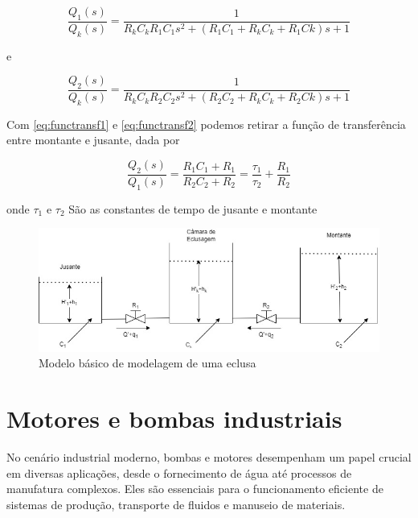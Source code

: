 \begin{equation} \label{eq:functransf1}
\frac{Q_1(s)}{Q_k(s)}=\frac{1}{R_kC_kR_1C_1s^2+(R_1C_1+R_kC_k+R_1Ck)s+1}
\end{equation}

e

\begin{equation} \label{eq:functransf2}
\frac{Q_2(s)}{Q_k(s)}=\frac{1}{R_kC_kR_2C_2s^2+(R_2C_2+R_kC_k+R_2Ck)s+1}
\end{equation}

Com \ref{eq:functransf1} e \ref{eq:functransf2} podemos retirar a função de transferência entre montante e jusante, dada por


\begin{equation} \label{eq:functransf2}
\frac{Q_2(s)}{Q_1(s)}=\frac{R_1C_1+R_1}{R_2C_2+R_2} = \frac{\tau _1}{\tau _2} + \frac{R_1}{R_2}
\end{equation}

onde $\tau _1$ e $\tau _2$ São as constantes de tempo de jusante e montante

\begin{figure}[h]
	\centering
	\label{fig:modelagem}
		\includegraphics[keepaspectratio=true,scale=0.6]{figuras/modelagem.jpg}
	\caption{Modelo básico de modelagem de uma eclusa}
\end{figure}


\section{Motores e bombas industriais}

No cenário industrial moderno, bombas e motores desempenham um papel crucial em diversas aplicações, desde o fornecimento de água até processos de manufatura complexos. Eles são essenciais para o funcionamento eficiente de sistemas de produção, transporte de fluidos e manuseio de materiais.

